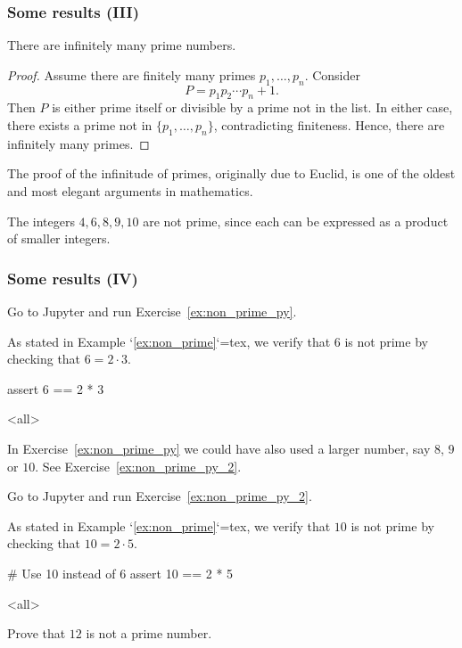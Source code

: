 \begin{frame}
\frametitle{Some results (III)}
\begin{proposition}
There are infinitely many prime numbers.
\end{proposition}

\begin{proof}
Assume there are finitely many primes \(p_1,\dots,p_n\). Consider
\[
P = p_1 p_2 \cdots p_n + 1.
\]
Then \(P\) is either prime itself or divisible by a prime not in the list. In either case, there exists a prime not in \(\{p_1,\dots,p_n\}\), contradicting finiteness. Hence, there are infinitely many primes.
\end{proof}

\begin{remark}[Euclid]
The proof of the infinitude of primes, originally due to Euclid, is one of the oldest and most elegant arguments in mathematics.
\end{remark}

\begin{example}
The integers $4, 6, 8, 9, 10$ are not prime, since each can be expressed as a product of smaller integers.
\label{ex:non_prime}
\end{example}
\end{frame}

\begin{frame}[fragile]
\frametitle{Some results (IV)}
\begin{pyexercise}{Go to Jupyter and run Exercise~\ref{ex:non_prime_py}.}
\begin{mdcell}
As stated in Example `\ref{ex:non_prime}`{=tex}, we verify that $6$ is not prime by checking that $6 = 2 \cdot 3$.
\end{mdcell}
\begin{pycell}
assert 6 == 2 * 3
\end{pycell}
\mode<all>
\label{ex:non_prime_py}
\end{pyexercise}

\begin{remark}
In Exercise~\ref{ex:non_prime_py} we could have also used a larger number, say $8$, $9$ or $10$. See Exercise~\ref{ex:non_prime_py_2}.
\end{remark}

\begin{pyexercise}{Go to Jupyter and run Exercise~\ref{ex:non_prime_py_2}.}
\begin{mdcell}
As stated in Example `\ref{ex:non_prime}`{=tex}, we verify that $10$ is not prime by checking that $10 = 2 \cdot 5$.
\end{mdcell}
\begin{pycell}
# Use 10 instead of 6
assert 10 == 2 * 5
\end{pycell}
\mode<all>
\label{ex:non_prime_py_2}
\end{pyexercise}

\begin{homework}
Prove that $12$ is not a prime number.
\end{homework}

\end{frame}
